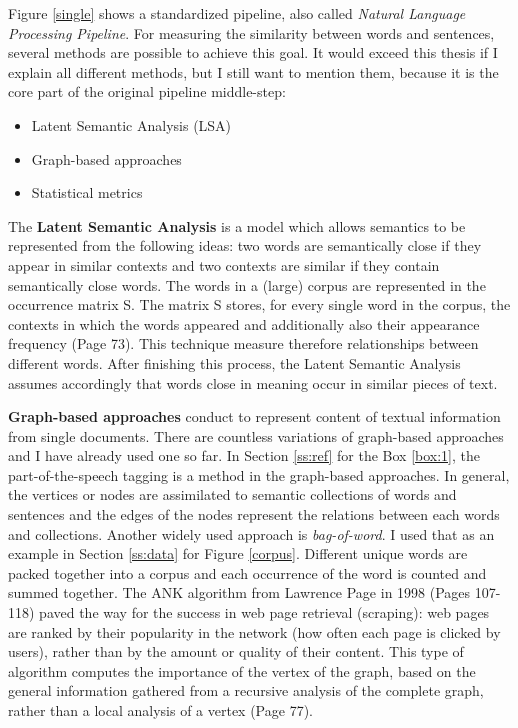 Figure \ref{single} shows a standardized pipeline, also called \textit{Natural Language Processing Pipeline}. For measuring the similarity between words and sentences, several methods are possible to achieve this goal. It would exceed this thesis if I explain all different methods, but I still want to mention them, because it is the core part of the original pipeline middle-step:

\begin{itemize}
	\item Latent Semantic Analysis (LSA)
	\item Graph-based approaches
	\item Statistical metrics
\end{itemize}

The \textbf{Latent Semantic Analysis} \cite{Deerwester90indexingby} is a model which allows semantics to be represented from the following ideas: two words are semantically close if they appear in similar contexts and two contexts are similar if they contain semantically close words. The words in a (large) corpus are represented in the occurrence matrix S. The matrix S stores, for every single word in the corpus, the contexts in which the words appeared and additionally also their appearance frequency \cite{juan} (Page 73). This technique measure therefore relationships between different words. After finishing this process, the Latent Semantic Analysis assumes accordingly that words close in meaning occur in similar pieces of text.

\textbf{Graph-based approaches} conduct to represent content of textual information from single documents. There are countless variations of graph-based approaches and I have already used one so far. In Section \ref{ss:ref} for the Box \ref{box:1}, the part-of-the-speech tagging is a method in the graph-based approaches. In general, the vertices or nodes are assimilated to semantic collections of words and sentences and the edges of the nodes represent the relations between each words and collections. 
Another widely used approach is \textit{bag-of-word}. I used that as an example in Section \ref{ss:data} for Figure \ref{corpus}. Different unique words are packed together into a corpus and each occurrence of the word is counted and summed together. The ANK algorithm from Lawrence Page in 1998 \cite{brin1998anatomy} (Pages 107-118) paved the way for the success in web page retrieval (scraping): web pages are ranked by their popularity in the network (how often each page is clicked by users), rather than by the amount or quality of their content. This type of algorithm computes the importance of the vertex of the graph, based on the general information gathered from a recursive analysis of the complete graph, rather than a local analysis of a vertex \cite{juan} (Page 77).

